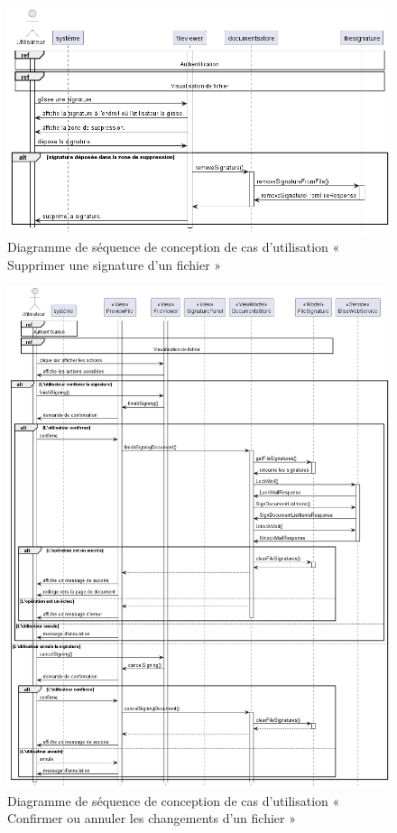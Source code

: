 \begin{figure}[H]
  \centering
  \includegraphics[width=1\textwidth]{out/diagrams/sprint4/sequence_delete_signature/sequence_delete_signature}
  \caption{Diagramme de séquence de conception de cas d'utilisation « Supprimer une signature d’un fichier »}
  \label{fig:sequence_conception_delete_signature}
\end{figure}

\begin{figure}[H]
  \centering
  \includegraphics[width=1\textwidth]{out/diagrams/sprint4/sequence_save_cancel_siganture/sequence_save_cancel_siganture}
  \caption{Diagramme de séquence de conception de cas d'utilisation « Confirmer ou annuler les changements d’un fichier »}
  \label{fig:sequence_conception_save_cancel_siganture}
\end{figure}



